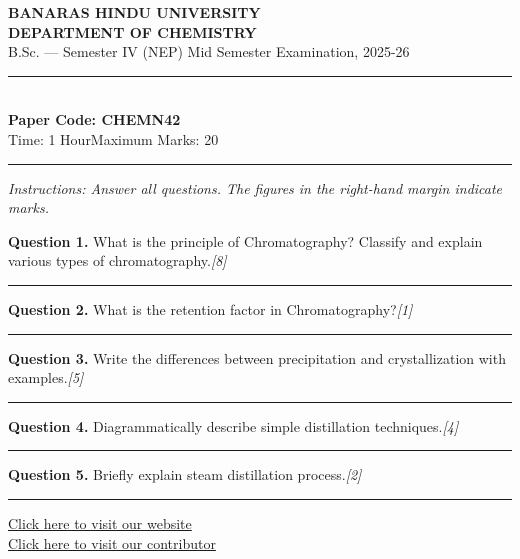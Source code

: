 \documentclass[11pt,a4paper]{article}
\newcommand{\pts}[1]{\hfill   \textit{[#1]}}
\begin{document}
\begin{center}
  {\large\bfseries BANARAS HINDU UNIVERSITY}\\[2pt]
  {\large\bfseries DEPARTMENT OF CHEMISTRY}\\[2pt]
  {\normalsize B.Sc. --- Semester IV (NEP) Mid Semester Examination, 2025-26}\\[6pt]
  \rule{0.8\linewidth}{0.5pt}\\[6pt]
  {\large\bfseries Paper Code: CHEMN42}\\[4pt]
  {\normalsize Time: 1 Hour\hfill Maximum Marks: 20}
\end{center}

\rule{\linewidth}{0.4pt}

\smallskip



\noindent   \textit{Instructions: Answer all questions. The figures in the right-hand margin indicate marks.}

\bigskip




\noindent   \textbf{Question 1.} What is the principle of Chromatography? Classify and explain various types of chromatography.\pts{8}

\medskip\rule{\linewidth}{0.2pt}\medskip




\noindent   \textbf{Question 2.} What is the retention factor in Chromatography?\pts{1}

\medskip\rule{\linewidth}{0.2pt}\medskip




\noindent   \textbf{Question 3.} Write the differences between precipitation and crystallization with examples.\pts{5}

\medskip\rule{\linewidth}{0.2pt}\medskip




\noindent   \textbf{Question 4.} Diagrammatically describe simple distillation techniques.\pts{4}

\medskip\rule{\linewidth}{0.2pt}\medskip




\noindent   \textbf{Question 5.} Briefly explain steam distillation process.\pts{2}

\vfill
\rule{\linewidth}{0.4pt}

\begin{center}\small
\href{https://bhu-exam.vercel.app/}{Click here to visit our website}\\[4pt]
\href{https://me-aryan.vercel.app/}{Click here to visit our contributor}
\end{center}
\end{document}
